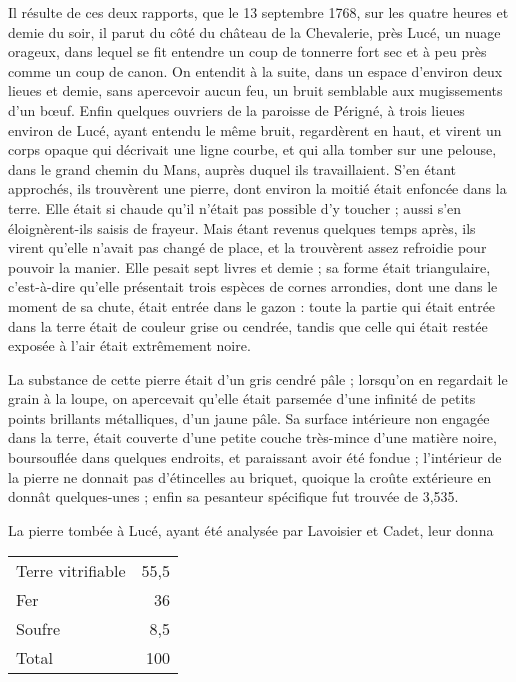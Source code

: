 \documentclass[a4paper, 12pt, oneside, french]{article}
\begin{document}
Il résulte de ces deux rapports, que le 13 septembre 1768, sur les quatre heures et demie du soir, il parut du côté du château de la Chevalerie, près Lucé, un nuage orageux, dans lequel se fit entendre un coup de tonnerre fort sec et à peu près comme un coup de canon. On entendit à la suite, dans un espace d'environ deux lieues et demie, sans apercevoir aucun feu, un bruit semblable aux mugissements d'un bœuf. Enfin quelques ouvriers de la paroisse de Périgné, à trois lieues environ de Lucé, ayant entendu le même bruit, regardèrent en haut, et virent un corps opaque qui décrivait une ligne courbe, et qui alla tomber sur une pelouse, dans le grand chemin du Mans, auprès duquel ils travaillaient. S'en étant approchés, ils trouvèrent une pierre, dont environ la moitié était enfoncée dans la terre. Elle était si chaude qu'il n'était pas possible d'y toucher ; aussi s'en éloignèrent-ils saisis de frayeur. Mais étant revenus quelques temps après, ils virent qu'elle n'avait pas changé de place, et la trouvèrent assez refroidie pour pouvoir la manier. Elle pesait sept livres et demie ; sa forme était triangulaire, c'est-à-dire qu'elle présentait trois espèces de cornes arrondies, dont une dans le moment de sa chute, était entrée dans le gazon : toute la partie qui était entrée dans la terre était de couleur grise ou cendrée, tandis que celle qui était restée exposée à l'air était extrêmement noire.

La substance de cette pierre était d'un gris cendré pâle ; lorsqu'on en regardait le grain à la loupe, on apercevait qu'elle était parsemée d'une infinité de petits points brillants métalliques, d'un jaune pâle. Sa surface intérieure non engagée dans la terre, était couverte d'une petite couche très-mince d'une matière noire, boursouflée dans quelques endroits, et paraissant avoir été fondue ; l'intérieur de la pierre ne donnait pas d'étincelles au briquet, quoique la croûte extérieure en donnât quelques-unes ; enfin sa pesanteur spécifique fut trouvée de 3,535.

La pierre tombée à Lucé, ayant été analysée par Lavoisier et Cadet, leur donna
\begin{table}[H]
    \centering
    \Fontauri
    \large
    \begin{tabular}{l r}
        Terre vitrifiable & 55,5 \\
        Fer & 36 \\
        Soufre & 8,5 \\ \hline
        Total & 100 \\
    \end{tabular}
\end{table}
\end{document}
